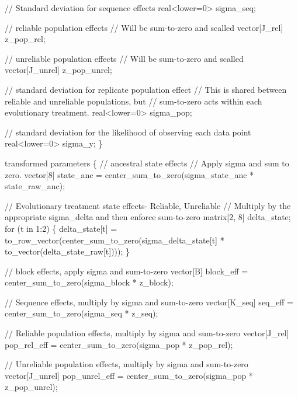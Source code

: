 \documentclass[
]{article}
\newenvironment{Shaded}{\begin{snugshade}}{\end{snugshade}}
\newcommand{\StringTok}[1]{\textcolor[rgb]{0.31,0.60,0.02}{#1}}
\begin{document}
\begin{Shaded}
\begin{Highlighting}[]
\StringTok{  // Standard deviation for sequence effects}
\StringTok{  real\textless{}lower=0\textgreater{} sigma\_seq;}

\StringTok{  // reliable population effects}
\StringTok{  // Will be sum{-}to{-}zero and scalled}
\StringTok{  vector[J\_rel] z\_pop\_rel;}

\StringTok{  // unreliable population effects}
\StringTok{  // Will be sum{-}to{-}zero and scalled}
\StringTok{  vector[J\_unrel] z\_pop\_unrel;}

\StringTok{  // standard deviation for replicate population effect}
\StringTok{  // This is shared between reliable and unreliable populations, but}
\StringTok{  // sum{-}to{-}zero acts within each evolutionary treatment. }
\StringTok{  real\textless{}lower=0\textgreater{} sigma\_pop;}

\StringTok{  // standard deviation for the likelihood of observing each data point }
\StringTok{  real\textless{}lower=0\textgreater{} sigma\_y;}
\StringTok{\}}

\StringTok{transformed parameters \{}
\StringTok{  // ancestral state effects}
\StringTok{  // Apply sigma and sum to zero. }
\StringTok{  vector[8] state\_anc = center\_sum\_to\_zero(sigma\_state\_anc * state\_raw\_anc);}

\StringTok{  // Evolutionary treatment state effects{-} Reliable, Unreliable}
\StringTok{  // Multiply by the appropriate sigma\_delta and then enforce sum{-}to{-}zero}
\StringTok{  matrix[2, 8] delta\_state;}
\StringTok{  for (t in 1:2) \{}
\StringTok{    delta\_state[t] =}
\StringTok{      to\_row\_vector(center\_sum\_to\_zero(sigma\_delta\_state[t] * to\_vector(delta\_state\_raw[t])));}
\StringTok{  \}}

\StringTok{  // block effects, apply sigma and sum{-}to{-}zero}
\StringTok{  vector[B] block\_eff = center\_sum\_to\_zero(sigma\_block * z\_block);}

\StringTok{  // Sequence effects, multiply by sigma and sum{-}to{-}zero}
\StringTok{ vector[K\_seq] seq\_eff = center\_sum\_to\_zero(sigma\_seq * z\_seq);}

\StringTok{  // Reliable population effects, multiply by sigma and sum{-}to{-}zero}
\StringTok{  vector[J\_rel] pop\_rel\_eff = center\_sum\_to\_zero(sigma\_pop * z\_pop\_rel);}

\StringTok{  // Unreliable population effects, multiply by sigma and sum{-}to{-}zero}
\StringTok{  vector[J\_unrel] pop\_unrel\_eff = center\_sum\_to\_zero(sigma\_pop * z\_pop\_unrel);}


\end{Highlighting}
\end{Shaded}
\end{document}
